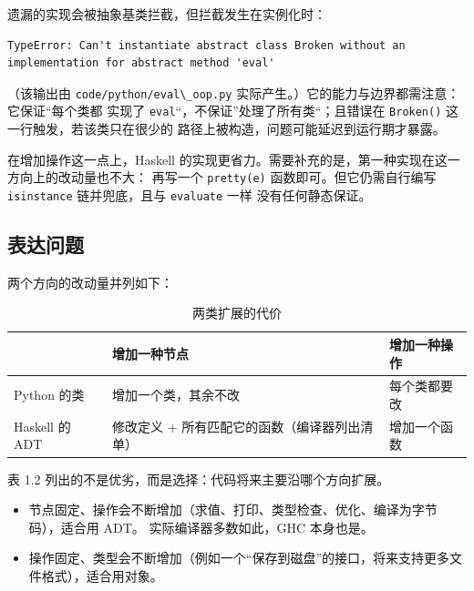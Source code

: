 遗漏的实现会被抽象基类拦截，但拦截发生在实例化时：

\begin{lstlisting}
TypeError: Can't instantiate abstract class Broken without an implementation for abstract method 'eval'
\end{lstlisting}

（该输出由 \passthrough{\lstinline!code/python/eval\_oop.py!} 实际产生。）它的能力与边界都需注意：它保证“每个类都
实现了 \passthrough{\lstinline!eval!}“，不保证”处理了所有类“；且错误在 \passthrough{\lstinline!Broken()!} 这一行触发，若该类只在很少的
路径上被构造，问题可能延迟到运行期才暴露。

在增加操作这一点上，Haskell 的实现更省力。需要补充的是，第一种实现在这一方向上的改动量也不大：
再写一个 \passthrough{\lstinline!pretty(e)!} 函数即可。但它仍需自行编写 \passthrough{\lstinline!isinstance!} 链并兜底，且与 \passthrough{\lstinline!evaluate!} 一样
没有任何静态保证。

\subsection{表达问题}\label{ux8868ux8fbeux95eeux9898}

两个方向的改动量并列如下：

{\small\setlength{\tabcolsep}{4pt} %
\begin{longtable}[]{@{}
  l
  l
  l@{}}
\caption{两类扩展的代价}\label{tab:1-2}\\
\toprule\noalign{}
\textbf{} & \textbf{增加一种节点} & \textbf{增加一种操作} \\
\midrule\noalign{}
\endhead
\bottomrule\noalign{}
\endlastfoot
Python 的类 & 增加一个类，其余不改 & 每个类都要改 \\
Haskell 的 ADT & 修改定义 + 所有匹配它的函数（编译器列出清单） & 增加一个函数 \\
\end{longtable}
}

表 1.2 列出的不是优劣，而是选择：代码将来主要沿哪个方向扩展。

\begin{itemize}
\tightlist
\item
  节点固定、操作会不断增加（求值、打印、类型检查、优化、编译为字节码），适合用 ADT。
  实际编译器多数如此，GHC 本身也是。
\item
  操作固定、类型会不断增加（例如一个“保存到磁盘”的接口，将来支持更多文件格式），适合用对象。
\end{itemize}

